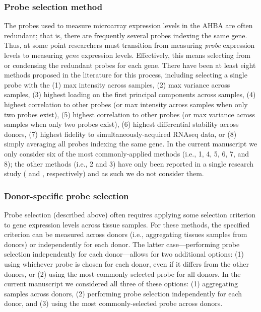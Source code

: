 \documentclass[12pt,aps,pra,reprint,showkeys]{revtex4-1}
\begin{document}
\subsubsection*{Probe selection method}

The probes used to measure microarray expression levels in the AHBA are often redundant; that is, there are frequently several probes indexing the same gene.
Thus, at some point researchers must transition from measuring \emph{probe} expression levels to measuring \emph{gene} expression levels.
Effectively, this means selecting from or condensing the redundant probes for each gene.
There have been at least eight methods proposed in the literature for this process, including selecting a single probe with the (1) max intensity across samples, (2) max variance across samples, (3) highest loading on the first principal components across samples, (4) highest correlation to other probes (or max intensity across samples when only two probes exist), (5) highest correlation to other probes (or max variance across samples when only two probes exist), (6) highest differential stability across donors, (7) highest fidelity to simultaneously-acquired RNAseq data, or (8) simply averaging all probes indexing the same gene.
In the current manuscript we only consider six of the most commonly-applied methods (i.e., 1, 4, 5, 6, 7, and 8); the other methods (i.e., 2 and 3) have only been reported in a single research study (\citealt{negi2017scireports} and \citealt{parkes2017gbb}, respectively) and as such we do not consider them.

\subsubsection*{Donor-specific probe selection}

Probe selection (described above) often requires applying some selection criterion to gene expression levels across tissue samples.
For these methods, the specified criterion can be measured across donors (i.e., aggregating tissues samples from donors) or independently for each donor.
The latter case---performing probe selection independently for each donor---allows for two additional options: (1) using whichever probe is chosen for each donor, even if it differs from the other donors, or (2) using the most-commonly selected probe for all donors.
In the current manuscript we considered all three of these options: (1) aggregating samples across donors, (2) performing probe selection independently for each donor, and (3) using the most commonly-selected probe across donors.
\end{document}
